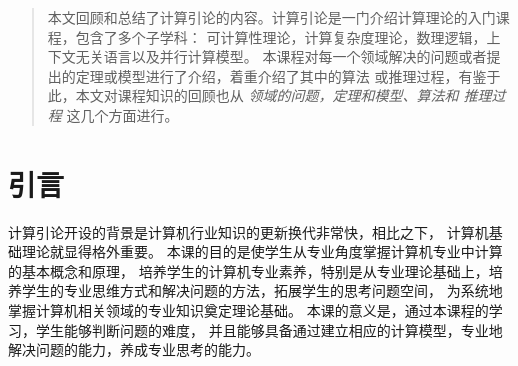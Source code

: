\begin{abstract}
        本文回顾和总结了计算引论的内容。计算引论是一门介绍计算理论的入门课程，包含了多个子学科：
        可计算性理论，计算复杂度理论，数理逻辑，上下文无关语言以及并行计算模型。
        本课程对每一个领域解决的问题或者提出的定理或模型进行了介绍，着重介绍了其中的算法
        或推理过程，有鉴于此，本文对课程知识的回顾也从 {\itshape 领域的问题，定理和模型、算法和
        推理过程} 这几个方面进行。

\end{abstract}

\chapter*{引言}
计算引论开设的背景是计算机行业知识的更新换代非常快，相比之下，
计算机基础理论就显得格外重要。
本课的目的是使学生从专业角度掌握计算机专业中计算的基本概念和原理，
培养学生的计算机专业素养，特别是从专业理论基础上，培养学生的专业思维方式和解决问题的方法，拓展学生的思考问题空间，
为系统地掌握计算机相关领域的专业知识奠定理论基础。
本课的意义是，通过本课程的学习，学生能够判断问题的难度，
并且能够具备通过建立相应的计算模型，专业地解决问题的能力，养成专业思考的能力。
